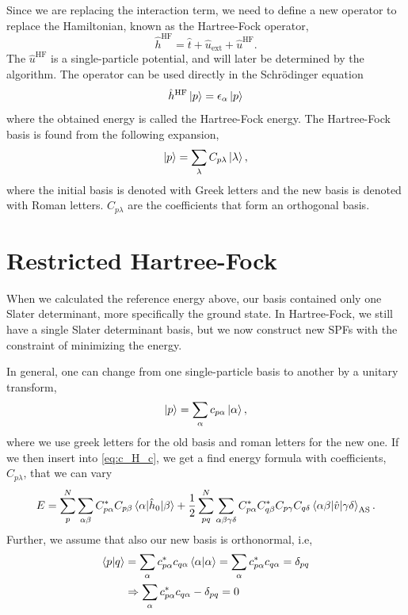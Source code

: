 Since we are replacing the interaction term, we need to define a new operator to replace the Hamiltonian, known as the Hartree-Fock operator,
\begin{equation}
\hat{h}^{\text{HF}}=\hat{t} + \hat{u}_{\text{ext}} + \hat{u}^{\text{HF}}.
\end{equation}
The $\hat{u}^{\text{HF}}$ is a single-particle potential, and will later be determined by the algorithm. The operator can be used directly in the Schrödinger equation 
\begin{equation}
\hat{h}^{\text{HF}}\ket{p}=\epsilon_{\alpha}\ket{p}
\end{equation}
where the obtained energy is called the Hartree-Fock energy. The Hartree-Fock basis is found from the following expansion,
\begin{equation}
\ket{p}=\sum_{\lambda}C_{p\lambda}\ket{\lambda},
\end{equation}
where the initial basis is denoted with Greek letters and the new basis is denoted with Roman letters. $C_{p\lambda}$ are the coefficients that form an orthogonal basis. 

\section{Restricted Hartree-Fock}
When we calculated the reference energy above, our basis contained only one Slater determinant, more specifically the ground state. In Hartree-Fock, we still have a single Slater determinant basis, but we now construct new SPFs with the constraint of minimizing the energy. 

In general, one can change from one single-particle basis to another by a unitary transform,
\begin{equation}
\ket{p}=\sum_{\alpha}c_{p\alpha}\ket{\alpha},
\end{equation}
where we use greek letters for the old basis and roman letters for the new one. If we then insert into \eqref{eq:c_H_c}, we get a find energy formula with coefficients, $C_{p\lambda}$, that we can vary
\begin{equation}
E=\sum_{p}^N\sum_{\alpha\beta}C_{p\alpha}^*C_{p\beta}\mel{\alpha}{\hat{h}_0}{\beta}+\frac{1}{2}
\sum_{pq}^N\sum_{\alpha\beta\gamma\delta}C_{p\alpha}^*C_{q\beta}^*C_{p\gamma}C_{q\delta}\mel{\alpha\beta}{\hat{v}}{\gamma\delta}_{\text{AS}}.
\end{equation}
Further, we assume that also our new basis is orthonormal, i.e,
\begin{align}
	\braket{p}{q}&=\sum_{\alpha}c_{p\alpha}^*c_{q\alpha}\braket{\alpha}{\alpha}=\sum_{\alpha}c_{p\alpha}^*c_{q\alpha}=\delta_{pq}\\
	&\Rightarrow\sum_{\alpha}c_{p\alpha}^*c_{q\alpha}-\delta_{pq}=0\label{eq:constraint}
\end{align}

